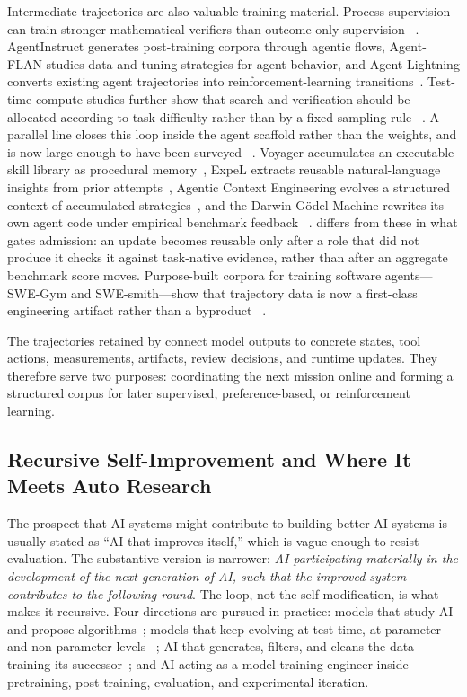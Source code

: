 Intermediate trajectories are also valuable training material. Process supervision
can train stronger mathematical verifiers than outcome-only supervision
~\citep{lightman2023verify}. AgentInstruct generates post-training corpora through
agentic flows, Agent-FLAN studies data and tuning strategies for agent behavior,
and Agent Lightning converts existing agent trajectories into reinforcement-learning
transitions~\citep{mitra2024agentinstruct,chen2024agentflan,luo2025agentlightning}.
Test-time-compute studies further show that search and verification should be
allocated according to task difficulty rather than by a fixed sampling rule
~\citep{snell2024testtime}. A parallel line closes this loop inside the agent
scaffold rather than the weights, and is now large enough to have been surveyed
~\citep{gao2025selfevolvingsurvey}. Voyager accumulates an executable skill library
as procedural memory~\citep{wang2023voyager}, ExpeL extracts reusable natural-language
insights from prior attempts~\citep{zhao2024expel}, Agentic Context Engineering
evolves a structured context of accumulated strategies~\citep{zhang2025ace}, and the
Darwin G\"odel Machine rewrites its own agent code under empirical benchmark feedback
~\citep{zhang2025darwingodel}. \systemname{} differs from these in what gates
admission: an update becomes reusable only after a role that did not produce it
checks it against task-native evidence, rather than after an aggregate benchmark
score moves. Purpose-built corpora for training
software agents---SWE-Gym and SWE-smith---show that trajectory data is now a
first-class engineering artifact rather than a byproduct
~\citep{pan2024swegym,yang2025swesmith}.

The trajectories retained by \systemname connect model outputs to concrete states,
tool actions, measurements, artifacts, review decisions, and runtime updates. They
therefore serve two purposes: coordinating the next mission online and forming a
structured corpus for later supervised, preference-based, or reinforcement learning.

\subsection{Recursive Self-Improvement and Where It Meets Auto Research}
\label{sec:rsi-related}

The prospect that AI systems might contribute to building better AI systems is
usually stated as ``AI that improves itself,'' which is vague enough to resist
evaluation. The substantive version is narrower: \emph{AI participating materially in
the development of the next generation of AI, such that the improved system
contributes to the following round}. The loop, not the self-modification, is what
makes it recursive. Four directions are pursued in practice: models that study AI and
propose algorithms~\citep{lu2024aiscientist,novikov2025alphaevolve}; models that keep
evolving at test time, at parameter and non-parameter levels
~\citep{snell2024testtime}; AI that generates, filters, and cleans the data training
its successor~\citep{mitra2024agentinstruct}; and AI acting as a model-training
engineer inside pretraining, post-training, evaluation, and experimental iteration.


